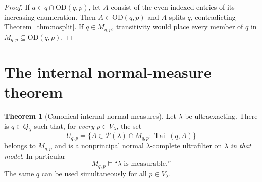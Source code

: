 \documentclass[11pt,letterpaper]{article}
\theoremstyle{definition}
\newtheorem{theorem}[definition]{Theorem}
\numberwithin{equation}{section}
\newcommand{\OD}{\mathrm{OD}}
\newcommand{\Pow}{\mathcal P}
\newcommand{\Tail}{\operatorname{Tail}}
\begin{document}
\begin{proof}
If $a\in q\cap\OD(q,p)$, let $A$ consist of the even-indexed entries of
its increasing enumeration. Then $A\in\OD(q,p)$ and $A$ splits $q$,
contradicting Theorem~\ref{thm:nosplit}. If $q\in M_{q,p}$, transitivity
would place every member of $q$ in $M_{q,p}\subseteq\OD(q,p)$.
\end{proof}

\section{The internal normal-measure theorem}\label{sec:measure}

\begin{theorem}[Canonical internal normal measures]\label{thm:measure}
Let $\lambda$ be ultraexacting. There is $q\in Q_\lambda$ such that, for
\emph{every} $p\in V_\lambda$, the set
\begin{equation}\label{eq:U}
 U_{q,p}=\{A\in\Pow(\lambda)\cap M_{q,p}:\Tail(q,A)\}
\end{equation}
belongs to $M_{q,p}$ and is a nonprincipal normal
$\lambda$-complete ultrafilter on $\lambda$ \emph{in that model}.
In particular
\[
 M_{q,p}\models\text{``$\lambda$ is measurable.''}
\]
The same $q$ can be used simultaneously for all $p\in V_\lambda$.
\end{theorem}
\end{document}
